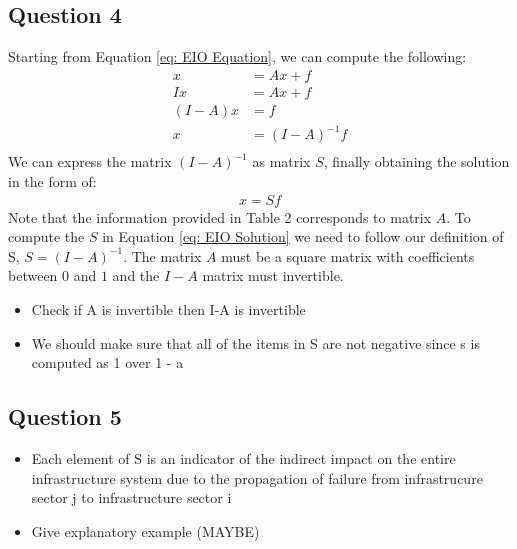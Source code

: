 \documentclass[11pt,a4paper]{article}
\begin{document}
\subsection*{Question 4}
Starting from Equation \ref{eq: EIO Equation}, we can compute the following:
\begin{align*}
	x &= Ax + f \\
	Ix &= Ax + f \\
	(I-A)x &= f \\
	x &= (I-A)^{-1}f \\
\end{align*}
We can express the matrix $(I-A)^{-1}$ as matrix $S$, finally obtaining the solution in the form of:
\begin{align} \label{eq: EIO Solution}
	x = Sf
\end{align}
Note that the information provided in Table 2 corresponds to matrix $A$. To compute the $S$ in Equation \ref{eq: EIO Solution} we need to follow our definition of S, $S = (I-A)^{-1}$. The matrix $A$ must be a square matrix with coefficients between $0$ and $1$ and the $I-A$ matrix must invertible. 
\begin{itemize}
	\item Check if A is invertible then I-A is invertible 
	\item We should make sure that all of the items in S are not negative since s is computed as 1 over 1 - a
\end{itemize}

\subsection*{Question 5}
\begin{itemize}
	\item Each element of S is an indicator of the indirect impact on the entire infrastructure system due to the propagation of failure from infrastrucure sector j to infrastructure sector i 
	\item Give explanatory example (MAYBE)
\end{itemize}
\end{document}
